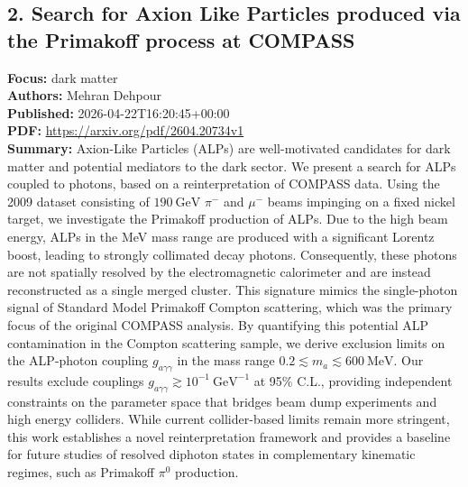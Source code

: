 \documentclass[11pt]{article}
\begin{document}
\subsection*{2. Search for Axion Like Particles produced via the Primakoff process at COMPASS}
\textbf{Focus:} dark matter\\
\textbf{Authors:} Mehran Dehpour\\
\textbf{Published:} 2026-04-22T16:20:45+00:00\\
\textbf{PDF:} \href{https://arxiv.org/pdf/2604.20734v1}{https://arxiv.org/pdf/2604.20734v1}\\
\textbf{Summary:}
Axion-Like Particles (ALPs) are well-motivated candidates for dark matter and potential mediators to the dark sector. We present a search for ALPs coupled to photons, based on a reinterpretation of COMPASS data. Using the 2009 dataset consisting of $190~\text{GeV}$ $\pi ^-$ and $\mu ^-$ beams impinging on a fixed nickel target, we investigate the Primakoff production of ALPs. Due to the high beam energy, ALPs in the MeV mass range are produced with a significant Lorentz boost, leading to strongly collimated decay photons. Consequently, these photons are not spatially resolved by the electromagnetic calorimeter and are instead reconstructed as a single merged cluster. This signature mimics the single-photon signal of Standard Model Primakoff Compton scattering, which was the primary focus of the original COMPASS analysis. By quantifying this potential ALP contamination in the Compton scattering sample, we derive exclusion limits on the ALP-photon coupling $g_{a\gamma \gamma }$ in the mass range $0.2 \lesssim m_a \lesssim 600~\text{MeV}$. Our results exclude couplings $g_{a\gamma \gamma } \gtrsim 10^{-1}~\text{GeV}^{-1}$ at 95\% C.L., providing independent constraints on the parameter space that bridges beam dump experiments and high energy colliders. While current collider-based limits remain more stringent, this work establishes a novel reinterpretation framework and provides a baseline for future studies of resolved diphoton states in complementary kinematic regimes, such as Primakoff $\pi ^0$ production.
\newpage
\end{document}
